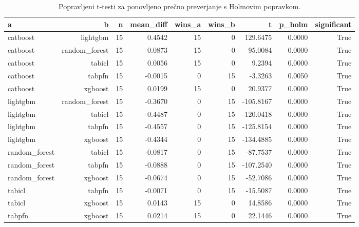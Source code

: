\begin{table}[htbp]
\centering
\caption{Popravljeni t-testi za ponovljeno prečno preverjanje s Holmovim popravkom.}
\label{tab:corrected-ttest}
\begin{tabular}{lrrrrrrrr}
\hline
a & b & n & mean\_diff & wins\_a & wins\_b & t & p\_holm & significant \\
\hline
catboost & lightgbm & 15 & 0.4542 & 15 & 0 & 129.6475 & 0.0000 & True \\
catboost & random\_forest & 15 & 0.0873 & 15 & 0 & 95.0084 & 0.0000 & True \\
catboost & tabicl & 15 & 0.0056 & 15 & 0 & 9.2394 & 0.0000 & True \\
catboost & tabpfn & 15 & -0.0015 & 0 & 15 & -3.3263 & 0.0050 & True \\
catboost & xgboost & 15 & 0.0199 & 15 & 0 & 20.9377 & 0.0000 & True \\
lightgbm & random\_forest & 15 & -0.3670 & 0 & 15 & -105.8167 & 0.0000 & True \\
lightgbm & tabicl & 15 & -0.4487 & 0 & 15 & -120.0418 & 0.0000 & True \\
lightgbm & tabpfn & 15 & -0.4557 & 0 & 15 & -125.8154 & 0.0000 & True \\
lightgbm & xgboost & 15 & -0.4344 & 0 & 15 & -134.4885 & 0.0000 & True \\
random\_forest & tabicl & 15 & -0.0817 & 0 & 15 & -87.7537 & 0.0000 & True \\
random\_forest & tabpfn & 15 & -0.0888 & 0 & 15 & -107.2540 & 0.0000 & True \\
random\_forest & xgboost & 15 & -0.0674 & 0 & 15 & -52.7086 & 0.0000 & True \\
tabicl & tabpfn & 15 & -0.0071 & 0 & 15 & -15.5087 & 0.0000 & True \\
tabicl & xgboost & 15 & 0.0143 & 15 & 0 & 14.8586 & 0.0000 & True \\
tabpfn & xgboost & 15 & 0.0214 & 15 & 0 & 22.1446 & 0.0000 & True \\
\hline
\end{tabular}
\end{table}

